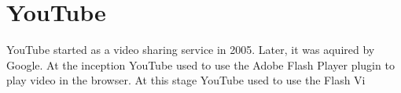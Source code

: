 \section{YouTube}
YouTube started as a video sharing service in 2005. Later, it was aquired by Google. At the inception YouTube used to use the Adobe Flash Player plugin to play video in the browser. At this stage YouTube used to use the Flash Vi